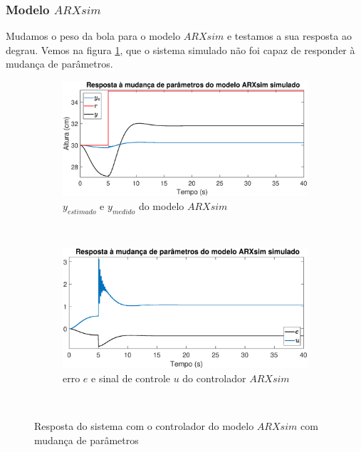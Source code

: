 \subsubsection{Modelo $ARXsim$}

Mudamos o peso da bola para o modelo $ARXsim$ e testamos a sua resposta ao degrau. Vemos na figura \ref{fig:mpsarxsimy}, que o sistema simulado não foi capaz de responder à mudança de parâmetros.

\begin{figure}[htb]
	\centering
	\begin{subfigure}[t]{0.48\textwidth}
		\includegraphics[width=1\linewidth]{pasta1_figuras/mpsarxsimy}
		\caption[$y_{estimado}$ e $y_{medido}$ do modelo $ARX2$]{$y_{estimado}$ e $y_{medido}$ do modelo $ARXsim$}
		\label{fig:mpsarxsimy}
	\end{subfigure}
	~ %
	\begin{subfigure}[t]{0.48\textwidth}
		\includegraphics[width=1\linewidth]{pasta1_figuras/mpsarxsime}
		\caption[erro $e$ e sinal de controle $u$ do controlador $ARX2$]{erro $e$ e sinal de controle $u$ do controlador $ARXsim$}
		\label{fig:mpsarxsime}
	\end{subfigure}
	~ %
	
	\caption{Resposta do sistema com o controlador do modelo $ARXsim$ com mudança de parâmetros}\label{fig:mpsarxsim}
\end{figure}

